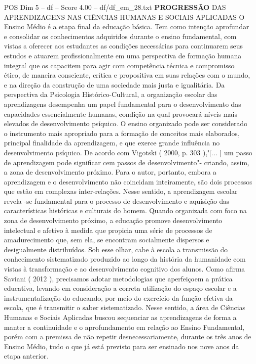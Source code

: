 \begin{textsample}{POS Dim 5 – df – Score 4.00 – df/df\_em\_28.txt}  \label{ex:f5_pos_157}
\textbf{PROGRESSÃO} DAS APRENDIZAGENS NAS CIÊNCIAS HUMANAS E SOCIAIS APLICADAS O Ensino Médio é a etapa final da educação básica.
Tem como intenção aprofundar e consolidar os conhecimentos adquiridos durante o ensino fundamental, com vistas a oferecer aos estudantes as condições necessárias para continuarem seus estudos e atuarem profissionalmente em uma perspectiva de formação humana integral que os capacitem para agir com competência técnica e compromisso ético, de maneira consciente, crítica e propositiva em suas relações com o mundo, e na direção da construção de uma sociedade mais justa e igualitária.
Da perspectiva da Psicologia Histórico-Cultural, a organização escolar das aprendizagens desempenha um papel fundamental para o desenvolvimento das capacidades essencialmente humanas, condição na qual provocará níveis mais elevados de desenvolvimento psíquico.
O ensino organizado pode ser considerado o instrumento mais apropriado para a formação de conceitos mais elaborados, principal finalidade da aprendizagem, e que exerce grande influência no desenvolvimento psíquico.
De acordo com Vigotski ( 2000, p. 303 ),"[... ] um passo de aprendizagem pode significar cem passos de desenvolvimento"- criando, assim, a zona de desenvolvimento próximo.
Para o autor, portanto, embora a aprendizagem e o desenvolvimento não coincidam inteiramente, são dois processos que estão em complexas inter-relações.
Nesse sentido, a aprendizagem escolar revela -se fundamental para o processo de desenvolvimento e aquisição das características históricas e culturais do homem.
Quando organizada com foco na zona de desenvolvimento próximo, a educação promove desenvolvimento intelectual e afetivo à medida que propicia uma série de processos de amadurecimento que, sem ela, se encontram socialmente dispersos e desigualmente distribuídos.
Sob esse olhar, cabe à escola a transmissão do conhecimento sistematizado produzido ao longo da história da humanidade com vistas à transformação e ao desenvolvimento cognitivo dos alunos.
Como afirma Saviani ( 2012 ), precisamos adotar metodologias que aperfeiçoem a prática educativa, levando em consideração a correta utilização do espaço escolar e a instrumentalização do educando, por meio do exercício da função efetiva da escola, que é transmitir o saber sistematizado.
Nesse sentido, a área de Ciências Humanas e Sociais Aplicadas buscou sequenciar as aprendizagens de forma a manter a continuidade e o aprofundamento em relação ao Ensino Fundamental, porém com a premissa de não repetir desnecessariamente, durante os três anos de Ensino Médio, tudo o que já está previsto para ser ensinado nos nove anos da etapa anterior.

\end{textsample}
